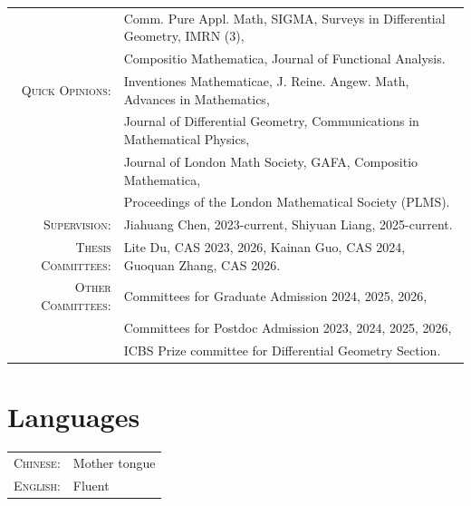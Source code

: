 \documentclass[a4paper,10pt]{article}
\begin{document}
\begin{tabularx}{\textwidth}{@{}rX@{}}
&Comm. Pure Appl. Math, SIGMA, Surveys in Differential Geometry, IMRN (3),\\
    & Compositio Mathematica, Journal of Functional Analysis.\\
    \textsc{Quick Opinions:} & Inventiones Mathematicae, J. Reine. Angew. Math, Advances in Mathematics, \\
    & Journal of Differential Geometry, Communications in Mathematical Physics,\\
    & Journal of London Math Society, GAFA, Compositio Mathematica, \\
    & Proceedings of the London Mathematical Society (PLMS).\\
    \textsc{Supervision: }& Jiahuang Chen, 2023-current, Shiyuan Liang, 2025-current.\\
    \textsc{Thesis Committees:} & Lite Du, CAS 2023, 2026, Kainan Guo, CAS 2024, Guoquan Zhang, CAS 2026.\\
    \textsc{Other Committees:} &Committees for Graduate Admission 2024, 2025, 2026, \\
    &Committees for Postdoc Admission 2023, 2024, 2025, 2026,\\
    &ICBS Prize committee for Differential Geometry Section.
\end{tabularx}

\section*{Languages}
\begin{tabular}{rl}
    \textsc{Chinese:} & Mother tongue \\
    \textsc{English:} & Fluent \\
\end{tabular}
\end{document}
